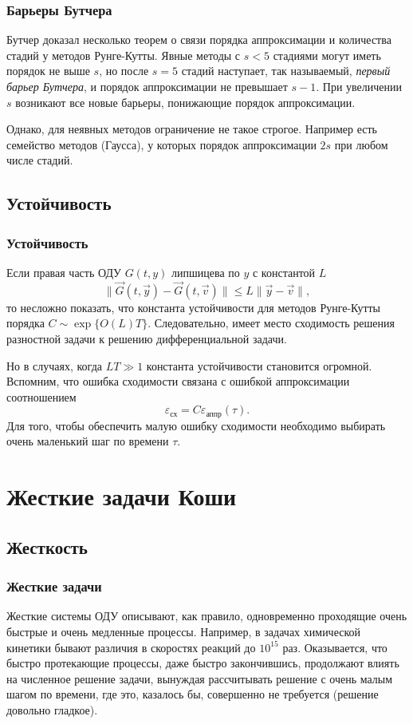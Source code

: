 \documentclass[professionalfonts,compress,unicode,aspectratio=169]{beamer}
\begin{document}
\begin{frame}\frametitle{Барьеры Бутчера}
	Бутчер доказал несколько теорем о связи порядка аппроксимации и количества стадий у методов Рунге-Кутты.
	Явные методы с $s<5$ стадиями могут иметь порядок не выше $s$, но после $s=5$ стадий наступает, так называемый,
	\emph{первый барьер Бутчера}, и порядок аппроксимации не превышает $s-1$. При увеличении $s$ возникают все новые барьеры, понижающие
	порядок аппроксимации.

	Однако, для неявных методов ограничение не такое строгое. Например есть семейство методов (Гаусса), у которых порядок аппроксимации $2s$ при любом числе стадий.
\end{frame}

\subsection{Устойчивость}
\begin{frame}\frametitle{Устойчивость}
	Если правая часть ОДУ $G(t,y)$ липшицева по $y$ с константой $L$
	$$\|\vec G(t,\vec y) - \vec G(t,\vec v)\| \leq L \|\vec y-\vec v\|,$$
	то несложно показать, что константа устойчивости для методов Рунге-Кутты порядка
	$C \sim \exp\{O(L)T\}$. Следовательно, имеет место сходимость решения разностной задачи к решению дифференциальной задачи.

	Но в случаях, когда $LT \gg 1$ константа устойчивости становится огромной.
	Вспомним, что ошибка сходимости связана с ошибкой аппроксимации
	соотношением
	$$\varepsilon_\text{сх} = C	\varepsilon_\text{аппр}(\tau).$$
	Для того, чтобы обеспечить малую ошибку сходимости необходимо выбирать очень
	маленький шаг по времени $\tau$.
\end{frame}

\section{Жесткие задачи Коши}
\subsection{Жесткость}
\begin{frame}\frametitle{Жесткие задачи}
	Жесткие системы ОДУ описывают, как правило, одновременно проходящие очень быстрые и очень медленные процессы. 
	Например, в задачах химической кинетики бывают различия в скоростях реакций до $10^{15}$ раз.
	\pause
	Оказывается, что быстро протекающие процессы, даже быстро закончившись, продолжают влиять на численное решение задачи, 
	вынуждая рассчитывать решение с очень малым шагом по времени, где это, казалось бы, совершенно не требуется (решение довольно гладкое).
\end{frame}
\end{document}
